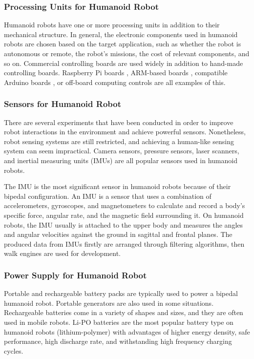 \documentclass[conference]{IEEEtran}
\begin{document}
\subsubsection{Processing Units for Humanoid Robot}
 Humanoid robots have one or more processing units in addition to their mechanical structure. In general, the electronic components used in humanoid robots are chosen based on the target application, such as whether the robot is autonomous or remote, the robot's missions, the cost of relevant components, and so on. Commercial controlling boards are used widely in addition to hand-made controlling boards. Raspberry Pi boards\autocite{7mejias2017easy} , ARM-based boards \autocite{9almubarak2017design}, compatible Arduino boards \autocite{8al2012development}, or off-board computing controls\autocite{10khokar2015implementation} are all examples of this.

 \subsubsection{Sensors for Humanoid Robot}
There are several experiments that have been conducted in order to improve robot interactions in the environment and achieve powerful sensors. Nonetheless, robot sensing systems are still restricted, and achieving a human-like sensing system can seem impractical\autocite{5saeedvand2019comprehensive}. Camera sensors, pressure sensors, laser scanners, and inertial measuring units (IMUs) are all popular sensors used in humanoid robots.

The IMU is the most significant sensor in humanoid robots because of their bipedal configuration. An IMU is a sensor that uses a combination of accelerometers, gyroscopes, and magnetometers to calculate and record a body's specific force, angular rate, and the magnetic field surrounding it. On humanoid robots, the IMU usually is attached to the upper body and measures the angles and angular velocities against the ground in sagittal and frontal planes\autocite{11cho2011online}. The produced data from IMUs firstly are arranged through filtering algorithms, then walk engines are used for development\autocite{5saeedvand2019comprehensive}.

\subsubsection{Power Supply for Humanoid Robot}
Portable and rechargeable battery packs are typically used to power a bipedal humanoid robot. Portable generators are also used in some situations. Rechargeable batteries come in a variety of shapes and sizes, and they are often used in mobile robots. Li-PO batteries are the most popular battery type on humanoid robots (lithium-polymer) with advantages of higher energy density, safe performance, high discharge rate, and withstanding high frequency charging cycles\autocite{5saeedvand2019comprehensive}.
\end{document}
